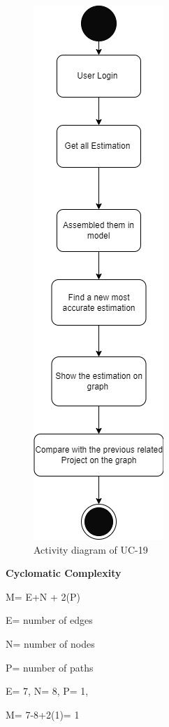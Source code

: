 \begin{figure}[H]
    \centering
    \includegraphics[scale=0.7]{./diagrams/Activity Diagram/ad-19.png}
    \caption{Activity diagram of UC-19}
    \label{fig:act-19}

\end{figure}

\textbf{Cyclomatic Complexity}

M= E+N + 2(P)

E= number of edges

N= number of nodes

P= number of paths

E= 7,
N= 8,
P= 1,

M= 7-8+2(1)= 1

